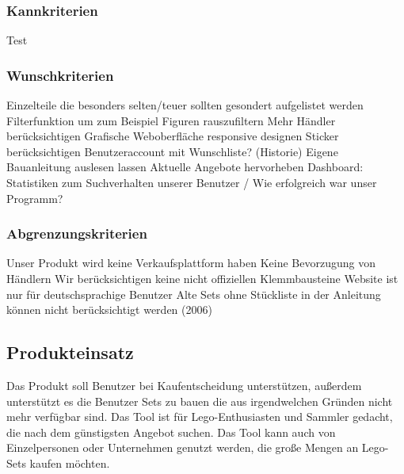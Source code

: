\subsubsection{Kannkriterien}
Test
\subsubsection{Wunschkriterien}
Einzelteile die besonders selten/teuer sollten gesondert aufgelistet werden \newline
Filterfunktion um zum Beispiel Figuren rauszufiltern \newline
Mehr Händler berücksichtigen \newline
Grafische Weboberfläche responsive designen \newline
Sticker berücksichtigen \newline
Benutzeraccount mit Wunschliste? (Historie) \newline
Eigene Bauanleitung auslesen lassen \newline
Aktuelle Angebote hervorheben \newline
Dashboard: Statistiken zum Suchverhalten unserer Benutzer / Wie erfolgreich war unser Programm? \newline

\subsubsection{Abgrenzungskriterien}
Unser Produkt wird keine Verkaufsplattform haben  \newline
Keine Bevorzugung von Händlern \newline
Wir berücksichtigen keine nicht offiziellen Klemmbausteine \newline
Website ist nur für deutschsprachige Benutzer \newline
Alte Sets ohne Stückliste in der Anleitung können nicht berücksichtigt werden (2006) \newline

\subsection{Produkteinsatz}
 Das Produkt soll Benutzer bei Kaufentscheidung unterstützen, außerdem unterstützt es die Benutzer Sets zu bauen die aus irgendwelchen Gründen nicht mehr verfügbar sind.\newline
Das Tool ist für Lego-Enthusiasten und Sammler gedacht, die nach dem günstigsten Angebot suchen. Das Tool kann auch von Einzelpersonen oder Unternehmen genutzt werden, die große Mengen an Lego-Sets kaufen möchten. \newline

